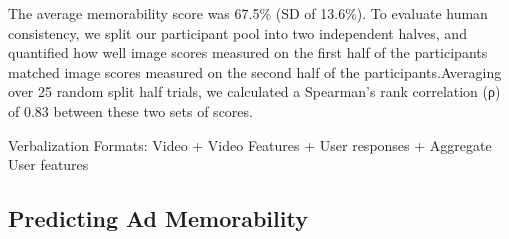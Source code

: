 The average memorability score was 67.5\% (SD of 13.6\%). 
To evaluate human consistency, we split our participant pool into two independent halves, and quantified how well image scores measured on the first half of the participants matched image scores measured on the second half of the participants.Averaging over 25 random split half trials, we calculated a Spearman's rank correlation (ρ) of 0.83 between these two sets of scores. 

Verbalization Formats:
Video + Video Features + User responses + Aggregate User features

\fi




\subsection{Predicting Ad Memorability}
\label{sec:Predicting Ad Memorability}


